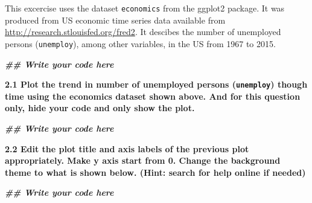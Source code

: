 \documentclass[
]{article}
\newenvironment{Shaded}{\begin{snugshade}}{\end{snugshade}}
\newcommand{\DocumentationTok}[1]{\textcolor[rgb]{0.56,0.35,0.01}{\textbf{\textit{#1}}}}
\begin{document}
This excercise uses the dataset \texttt{economics} from the ggplot2
package. It was produced from US economic time series data available
from \url{http://research.stlouisfed.org/fred2}. It descibes the number
of unemployed persons (\texttt{unemploy}), among other variables, in the
US from 1967 to 2015.

\begin{Shaded}
\begin{Highlighting}[]
\DocumentationTok{\#\# Write your code here}
\end{Highlighting}
\end{Shaded}

\textbf{2.1 Plot the trend in number of unemployed persons
(\texttt{unemploy}) though time using the economics dataset shown above.
And for this question only, hide your code and only show the plot.}

\begin{Shaded}
\begin{Highlighting}[]
\DocumentationTok{\#\# Write your code here}
\end{Highlighting}
\end{Shaded}

\textbf{2.2 Edit the plot title and axis labels of the previous plot
appropriately. Make y axis start from 0. Change the background theme to
what is shown below. (Hint: search for help online if needed)}

\begin{Shaded}
\begin{Highlighting}[]
\DocumentationTok{\#\# Write your code here}
\end{Highlighting}
\end{Shaded}
\end{document}
